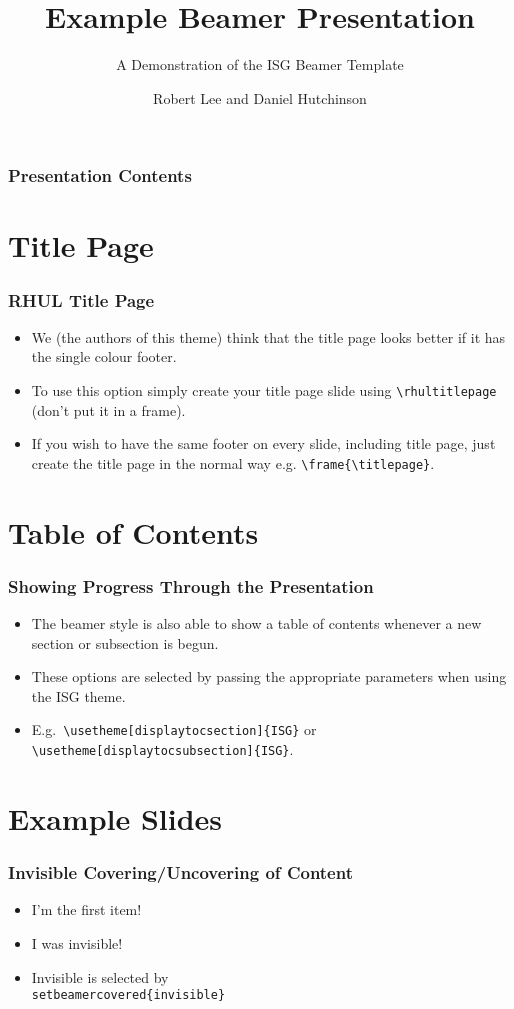 \documentclass[]{beamer}
\title{Example Beamer Presentation}
\subtitle{A Demonstration of the ISG Beamer Template}
\author[R. Lee \& D. Hutchinson]{Robert Lee and Daniel Hutchinson}
\institute{Information Security Group,\\
Royal Holloway}
\begin{document}
\rhultitlepage

\begin{frame}\frametitle{Presentation Contents}
	\tableofcontents
\end{frame}

\section{Title Page}
\begin{frame}\frametitle{RHUL Title Page}
\begin{itemize}
	\item We (the authors of this theme) think that the title page looks better if it has the single colour footer.
	\item To use this option simply create your title page slide using \texttt{\textbackslash rhultitlepage} (don't put it in a frame).
	\item If you wish to have the same footer on every slide, including title page, just create the title page in the normal way e.g. \texttt{\textbackslash frame\{\textbackslash titlepage\}}.
\end{itemize}
\end{frame}

\section{Table of Contents}
\begin{frame}\frametitle{Showing Progress Through the Presentation}
\begin{itemize}
	\item The beamer style is also able to show a table of contents whenever a new section or subsection is begun.
	\item These options are selected by passing the appropriate parameters when using the ISG theme.
	\item E.g.\ \texttt{\textbackslash usetheme[displaytocsection]\{ISG\}} or \texttt{\textbackslash usetheme[displaytocsubsection]\{ISG\}}.
\end{itemize}
\end{frame}

\section{Example Slides}
\begin{frame}\frametitle{Invisible Covering/Uncovering of Content}
\begin{itemize}
	\item I'm the first item!
	\pause
	\item I was invisible!
	\pause
	\item Invisible is selected by \texttt{\\setbeamercovered\{invisible\}}
\end{itemize}
\end{frame}
\end{document}
